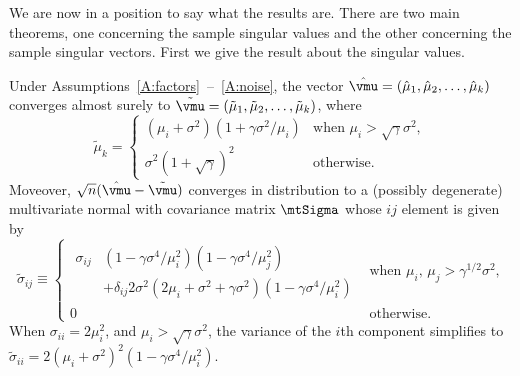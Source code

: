 We are now in a position to say what the results are.  There are two main
theorems, one concerning the sample singular values and the other concerning
the sample singular vectors.  First we give the result about the singular
values.
\begin{theorem}\label{T:values}
    Under Assumptions~\ref{A:factors}~--~\ref{A:noise},
    the vector $\hat \vmu = (\hat \mu_1, \hat \mu_2, \ldots, \hat \mu_k)$
    converges almost surely to 
    $\tilde \vmu = (\tilde \mu_1, \tilde \mu_2, \ldots, \tilde \mu_k)$,
    where
    \[
        \tilde \mu_k
        =
        \begin{cases}
            \left( \mu_i + \sigma^2 \right)
            \left( 1 + \gamma \sigma^2 / \mu_i \right)
                &\text{when $\mu_i > \sqrt{\gamma} \sigma^2$}, \\
            \sigma^2 \left( 1 + \sqrt{\gamma} \right)^2
                &\text{otherwise.}
        \end{cases}
    \]
    Moveover, 
    \(
        \sqrt{n} (\hat \vmu - \tilde \vmu)
    \)
    converges in distribution to a (possibly degenerate) multivariate normal
    with covariance matrix $\mtSigma$ whose $ij$ element is given by
    \[
        \tilde \sigma_{ij}
        \equiv
        \begin{cases}
            \begin{aligned}
                \sigma_{ij}
                &\left(
                    1 - \gamma \sigma^4 / \mu_i^2
                \right)
                \left(
                    1 - \gamma \sigma^4 / \mu_j^2
                \right)
                \\
                &+ \delta_{ij}
                2
                \sigma^2
                \left(
                    2 \mu_i + \sigma^2 + \gamma \sigma^2
                \right)
                \left(
                    1 - \gamma \sigma^4 / \mu_i^2
                \right)
            \end{aligned}
                &\text{when $\mu_i, \, \mu_j > \gamma^{1/2} \sigma^2$,} \\
            0
                &\text{otherwise.}
        \end{cases}
    \]
    When $\sigma_{ii} = 2 \mu_i^2$, 
    and $\mu_i > \sqrt{\gamma} \sigma^2$, the variance of the $i$th
    component simplifies to
    \(
        \tilde \sigma_{ii} 
        = 
        2 (\mu_i + \sigma^2)^2 \left( 1 - \gamma \sigma^4 / \mu_i^2 \right).
    \)
\end{theorem}

